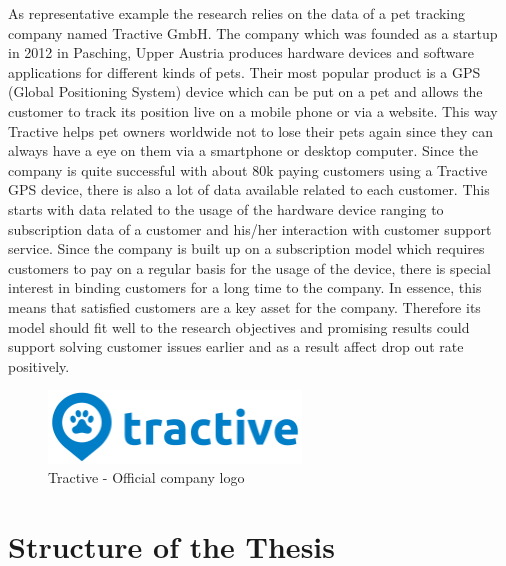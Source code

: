 As representative example the research relies on the data of a pet tracking company named Tractive GmbH. The company which was founded as a startup in 2012 in Pasching, Upper Austria produces hardware devices and software applications for different kinds of pets. Their most popular product is a GPS (Global Positioning System) device which can be put on a pet and allows the customer to track its position live on a mobile phone or via a website. This way Tractive helps pet owners worldwide not to lose their pets again since they can always have a eye on them via a smartphone or desktop computer. Since the company is quite successful with about 80k paying customers using a Tractive GPS device, there is also a lot of data available related to each customer. This starts with data related to the usage of the hardware device ranging to subscription data of a customer and his/her interaction with customer support service. Since the company is built up on a subscription model which requires customers to pay on a regular basis for the usage of the device, there is special interest in binding customers for a long time to the company. In essence, this means that satisfied customers are a key asset for the company. Therefore its model should fit well to the research objectives and promising results could support solving customer issues earlier and as a result affect drop out rate positively. 

\begin{figure}[H]
	\centering
	\includegraphics[width=0.6\textwidth]{img/tractive-logo.png}
	\caption{Tractive - Official company logo}	
\end{figure}

\section{Structure of the Thesis}

